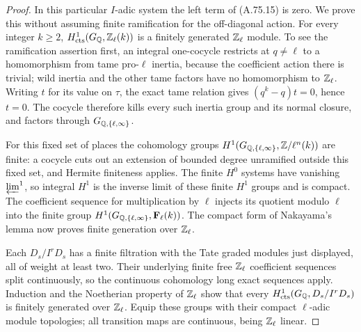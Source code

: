 \begin{proof}
In this particular $I$-adic system the left term of
(A.75.15) is zero.  We prove this without assuming finite
ramification for the off-diagonal action.
For every integer $k\geq2$,
$H^1_{\rm cts}(G_\mathbb Q,\mathbb Z_\ell(k))$ is a finitely generated
$\mathbb Z_\ell$ module.
To see the ramification assertion first, an integral
one-cocycle restricts at $q\ne\ell$ to a homomorphism from
tame pro-$\ell$ inertia, because the coefficient action
there is trivial; wild inertia and the other tame factors
have no homomorphism to $\mathbb Z_\ell$.
Writing $t$ for its value on $\tau$, the exact tame
relation gives
$(q^k-q)t=0$, hence $t=0$.
The cocycle therefore kills every such inertia group
and its normal closure, and factors through
$G_{\mathbb Q,\{\ell,\infty\}}$.

For this fixed set of places the cohomology groups
$H^1(G_{\mathbb Q,\{\ell,\infty\}},\mathbb Z/\ell^n(k))$ are finite:
a cocycle cuts out an extension of bounded degree
unramified outside this fixed set, and Hermite finiteness
applies.  The finite $H^0$ systems have vanishing
$\varprojlim^1$, so integral $H^1$ is the inverse limit
of these finite $H^1$ groups and is compact.
The coefficient sequence for multiplication by $\ell$
injects its quotient modulo $\ell$ into the finite group
$H^1(G_{\mathbb Q,\{\ell,\infty\}},\mathbf F_\ell(k))$.
The compact form of Nakayama's lemma now proves finite
generation over $\mathbb Z_\ell$.

Each $D_s/I^rD_s$ has a finite filtration with the
Tate graded modules just displayed, all of weight at
least two.  Their underlying finite free $\mathbb Z_\ell$
coefficient sequences split continuously, so the
continuous cohomology long exact sequences apply.
Induction and the Noetherian property of $\mathbb Z_\ell$
show that every
$H^1_{\rm cts}(G_\mathbb Q,D_s/I^rD_s)$ is finitely generated
over $\mathbb Z_\ell$.
Equip these groups with their compact $\ell$-adic
module topologies; all transition maps are continuous,
being $\mathbb Z_\ell$ linear.


\end{proof}

